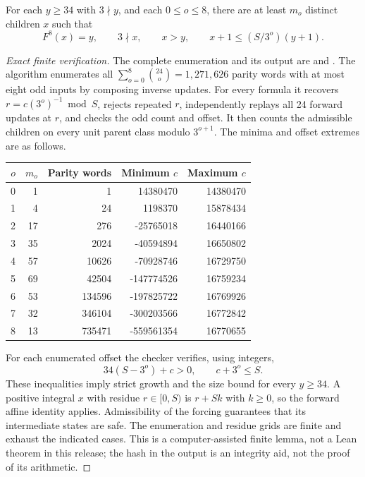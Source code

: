 \begin{lemma}\label{lem:inverse-certificate}
For each $y\ge34$ with $3\nmid y$, and each $0\le o\le8$, there are at
least $m_o$ distinct children $x$ such that
\[
 F^8(x)=y,\qquad 3\nmid x,\qquad x>y,\qquad
 x+1\le(S/3^o)(y+1).
\]
\end{lemma}
\begin{proof}[Exact finite verification]
The complete enumeration and its output are
 and
. The algorithm enumerates
all $\sum_{o=0}^8\binom{24}{o}=1{,}271{,}626$ parity words with at most
eight odd inputs by composing inverse updates. For every formula it
recovers $r=c(3^o)^{-1}\bmod S$, rejects repeated $r$, independently replays
all 24 forward updates at $r$, and checks the odd count and offset.
It then counts the admissible children on every unit parent class modulo
$3^{o+1}$. The minima and offset extremes are as follows.
\begin{center}\small
\begin{tabular}{rrrrr}\toprule
$o$ & $m_o$ & Parity words & Minimum $c$ & Maximum $c$\\\midrule
0&1&1&14380470&14380470\\
1&4&24&1198370&15878434\\
2&17&276&-25765018&16440166\\
3&35&2024&-40594894&16650802\\
4&57&10626&-70928746&16729750\\
5&69&42504&-147774526&16759234\\
6&53&134596&-197825722&16769926\\
7&32&346104&-300203566&16772842\\
8&13&735471&-559561354&16770655\\\bottomrule
\end{tabular}
\end{center}
For each enumerated offset the checker verifies, using integers,
\[
 34(S-3^o)+c>0,\qquad c+3^o\le S.
\]
These inequalities imply strict growth and the size bound for every
$y\ge34$. A positive integral $x$ with residue $r\in[0,S)$ is $r+Sk$
with $k\ge0$, so the forward affine identity applies. Admissibility of the
forcing guarantees that its intermediate states are safe. The enumeration
and residue grids are finite and exhaust the indicated cases. This is a
computer-assisted finite lemma, not a Lean theorem in this release; the
hash in the output is an integrity aid, not the proof of its arithmetic.
\end{proof}

